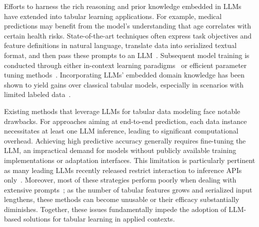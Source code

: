 Efforts to harness the rich reasoning and prior knowledge embedded in LLMs have extended into tabular learning applications. For example, medical predictions may benefit from the model’s understanding that age correlates with certain health risks. State-of-the-art techniques often express task objectives and feature definitions in natural language, translate data into serialized textual format, and then pass these prompts to an LLM~\cite{dinh2022lift,wang2023anypredict}. Subsequent model training is conducted through either in-context learning paradigms~\cite{nam2023semi} or efficient parameter tuning methods~\cite{dinh2022lift,hegselmann2023tabllm}. Incorporating LLMs’ embedded domain knowledge has been shown to yield gains over classical tabular models, especially in scenarios with limited labeled data~\cite{hegselmann2023tabllm}.

Existing methods that leverage LLMs for tabular data modeling face notable drawbacks. For approaches aiming at end-to-end prediction, each data instance necessitates at least one LLM inference, leading to significant computational overhead. Achieving high predictive accuracy generally requires fine-tuning the LLM, an impractical demand for models without publicly available training implementations or adaptation interfaces. This limitation is particularly pertinent as many leading LLMs recently released restrict interaction to inference APIs only~\cite{anil2023palm,openai2023gpt4}. Moreover, most of these strategies perform poorly when dealing with extensive prompts~\cite{liu2023lost}; as the number of tabular features grows and serialized input lengthens, these methods can become unusable or their efficacy substantially diminishes. Together, these issues fundamentally impede the adoption of LLM-based solutions for tabular learning in applied contexts.

